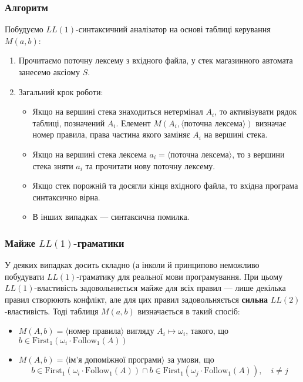 \subsubsection{Алгоритм}

Побудуємо $LL(1)$-синтаксичний аналізатор на основі таблиці керування $M(a,b)$:
\begin{enumerate}
	\item Прочитаємо поточну лексему з вхідного файла, у стек магазинного автомата занесемо аксіому $S$.
	\item Загальний крок роботи:
	\begin{itemize}
		\item Якщо на вершині стека знаходиться нетермінал $A_i$, то активізувати рядок таблиці, позначений $A_i$. Елемент $M(A_i, \langle\text{поточна лексема}\rangle)$ визначає номер правила, права частина якого заміняє $A_i$ на вершині стека.
		\item Якщо на вершині стека лексема $a_i = \langle\text{поточна лексема}\rangle$, то з вершини стека зняти $a_i$ та прочитати нову поточну лексему.
		\item Якщо стек порожній та досягли кінця вхідного файла, то вхідна програма синтаксично вірна.
		\item В інших випадках --- синтаксична помилка.
	\end{itemize}
\end{enumerate}

\subsubsection{Майже $LL(1)$-граматики}

У деяких випадках досить складно (а інколи й принципово неможливо побудувати $LL(1)$-граматику для реальної мови програмування. При цьому $LL(1)$-властивість задовольняється майже для всіх правил --- лише декілька правил створюють конфлікт, але для цих правил задовольняється \textbf{сильна} $LL(2)$-властивість. Тоді таблиця $M(a,b)$ визначається в такий спосіб:
\begin{itemize}
	\item $M(A,b) = \langle\text{номер правила}\rangle$ вигляду $A_i \mapsto \omega_i$, такого, що $b \in \text{First}_1(\omega_i \cdot \text{Follow}_1(A))$
	\item $M(A,b) = \langle\text{ім'я допоміжної програми}\rangle$ за умови, що \[b \in \text{First}_1(\omega_i \cdot \text{Follow}_1(A)) \cap b \in \text{First}_1(\omega_j \cdot \text{Follow}_1(A)), \quad i \ne j\]
\end{itemize}

